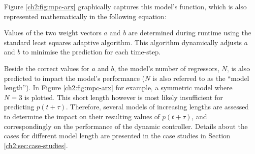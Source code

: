 

Figure \ref{ch2:fig:mpc-arx} graphically captures this model's function, which is also represented mathematically in the following equation:



Values of the two weight vectors $a$ and $b$ are determined during runtime using the standard least squares adaptive algorithm.
This algorithm dynamically adjusts $a$ and $b$ to minimise the prediction for each time-step.

Beside the correct values for $a$ and $b$, the model's number of regressors, $N$, is also predicted to impact the model's performance ($N$ is also referred to as the ``model length'').
In Figure \ref{ch2:fig:mpc-arx} for example, a symmetric model where $N=3$ is plotted.
This short length however is most likely insufficient for predicting $p(t+\tau)$.
Therefore, several models of increasing lengths are assessed to determine the impact on their resulting values of $\hat{p}(t+\tau)$, and correspondingly on the performance of the dynamic controller.
Details about the cases for different model length are presented in the case studies in Section \ref{ch2:sec:case-studies}.















